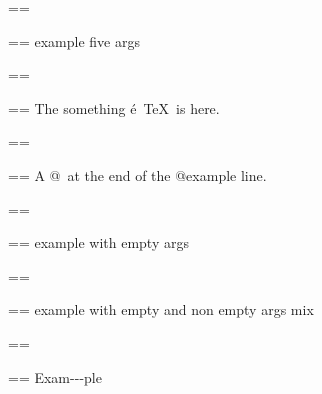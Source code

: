 \documentclass{book}
\makeatletter
\newenvironment{Texinfopreformatted}{%
  \par\GNUTobeylines\obeyspaces\frenchspacing\parskip=\z@\parindent=\z@}{}
{\catcode`\^^M=13 \gdef\GNUTobeylines{\catcode`\^^M=13 \def^^M{\null\par}}}
\newenvironment{Texinfoindented}{\begin{list}{}{}\item\relax}{\end{list}}
\renewcommand{\_}{\Texinfounderscore\discretionary{}{}{}}
\makeatother
\begin{document}
\begin{Texinfoindented}
\begin{Texinfopreformatted}
\ttfamily 
\end{Texinfopreformatted}
\begin{Texinfoindented}
\begin{Texinfopreformatted}%
\ttfamily example five args
\end{Texinfopreformatted}
\end{Texinfoindented}
\begin{Texinfopreformatted}%
\ttfamily 
\end{Texinfopreformatted}
\begin{Texinfoindented}
\begin{Texinfopreformatted}%
\ttfamily The something \'{e}\ \TeX{}\ is here.
\end{Texinfopreformatted}
\end{Texinfoindented}
\begin{Texinfopreformatted}%
\ttfamily 
\end{Texinfopreformatted}
\begin{Texinfoindented}
\begin{Texinfopreformatted}%
\ttfamily A @\ at the end of the @example line.
\end{Texinfopreformatted}
\end{Texinfoindented}
\begin{Texinfopreformatted}%
\ttfamily 
\end{Texinfopreformatted}
\begin{Texinfoindented}
\begin{Texinfopreformatted}%
\ttfamily example with empty args
\end{Texinfopreformatted}
\end{Texinfoindented}
\begin{Texinfopreformatted}%
\ttfamily 
\end{Texinfopreformatted}
\begin{Texinfoindented}
\begin{Texinfopreformatted}%
\ttfamily example with empty and non empty args mix
\end{Texinfopreformatted}
\end{Texinfoindented}
\begin{Texinfopreformatted}%
\ttfamily 
\end{Texinfopreformatted}
\begin{Texinfoindented}
\begin{Texinfopreformatted}%
\ttfamily Exam{-}{-}{-}ple


\end{Texinfopreformatted}
\end{Texinfoindented}
\end{Texinfoindented}
\end{document}
